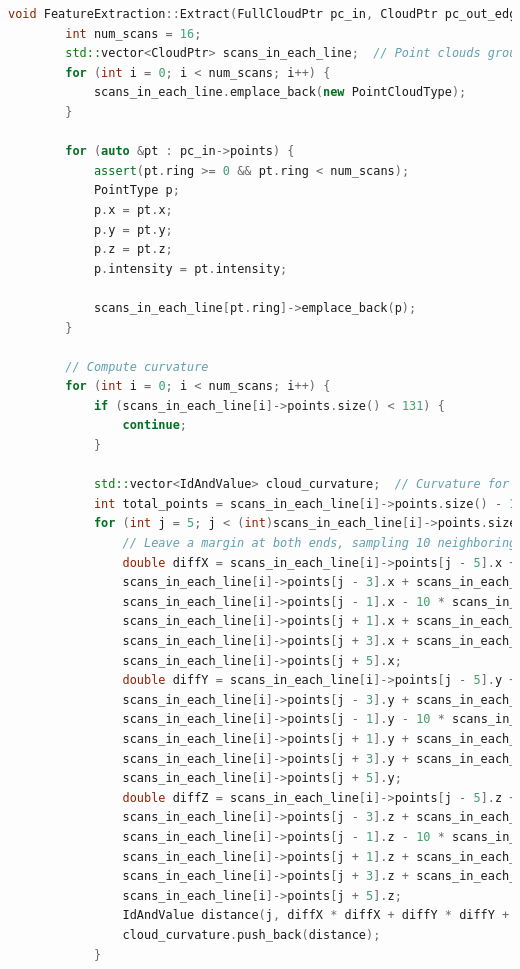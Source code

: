 \begin{lstlisting}[language=c++,caption=src/ch7/loam\_like/feature\_extraction.cc]  
	void FeatureExtraction::Extract(FullCloudPtr pc_in, CloudPtr pc_out_edge, CloudPtr pc_out_surf) {  
		int num_scans = 16;  
		std::vector<CloudPtr> scans_in_each_line;  // Point clouds grouped by beam  
		for (int i = 0; i < num_scans; i++) {  
			scans_in_each_line.emplace_back(new PointCloudType);  
		}  
		
		for (auto &pt : pc_in->points) {  
			assert(pt.ring >= 0 && pt.ring < num_scans);  
			PointType p;  
			p.x = pt.x;  
			p.y = pt.y;  
			p.z = pt.z;  
			p.intensity = pt.intensity;  
			
			scans_in_each_line[pt.ring]->emplace_back(p);  
		}  
		
		// Compute curvature  
		for (int i = 0; i < num_scans; i++) {  
			if (scans_in_each_line[i]->points.size() < 131) {  
				continue;  
			}  
			
			std::vector<IdAndValue> cloud_curvature;  // Curvature for each beam  
			int total_points = scans_in_each_line[i]->points.size() - 10;  
			for (int j = 5; j < (int)scans_in_each_line[i]->points.size() - 5; j++) {  
				// Leave a margin at both ends, sampling 10 neighboring points for averaging  
				double diffX = scans_in_each_line[i]->points[j - 5].x + scans_in_each_line[i]->points[j - 4].x +  
				scans_in_each_line[i]->points[j - 3].x + scans_in_each_line[i]->points[j - 2].x +  
				scans_in_each_line[i]->points[j - 1].x - 10 * scans_in_each_line[i]->points[j].x +  
				scans_in_each_line[i]->points[j + 1].x + scans_in_each_line[i]->points[j + 2].x +  
				scans_in_each_line[i]->points[j + 3].x + scans_in_each_line[i]->points[j + 4].x +  
				scans_in_each_line[i]->points[j + 5].x;  
				double diffY = scans_in_each_line[i]->points[j - 5].y + scans_in_each_line[i]->points[j - 4].y +  
				scans_in_each_line[i]->points[j - 3].y + scans_in_each_line[i]->points[j - 2].y +  
				scans_in_each_line[i]->points[j - 1].y - 10 * scans_in_each_line[i]->points[j].y +  
				scans_in_each_line[i]->points[j + 1].y + scans_in_each_line[i]->points[j + 2].y +  
				scans_in_each_line[i]->points[j + 3].y + scans_in_each_line[i]->points[j + 4].y +  
				scans_in_each_line[i]->points[j + 5].y;  
				double diffZ = scans_in_each_line[i]->points[j - 5].z + scans_in_each_line[i]->points[j - 4].z +  
				scans_in_each_line[i]->points[j - 3].z + scans_in_each_line[i]->points[j - 2].z +  
				scans_in_each_line[i]->points[j - 1].z - 10 * scans_in_each_line[i]->points[j].z +  
				scans_in_each_line[i]->points[j + 1].z + scans_in_each_line[i]->points[j + 2].z +  
				scans_in_each_line[i]->points[j + 3].z + scans_in_each_line[i]->points[j + 4].z +  
				scans_in_each_line[i]->points[j + 5].z;  
				IdAndValue distance(j, diffX * diffX + diffY * diffY + diffZ * diffZ);  
				cloud_curvature.push_back(distance);  
			}  
			

\end{lstlisting}
